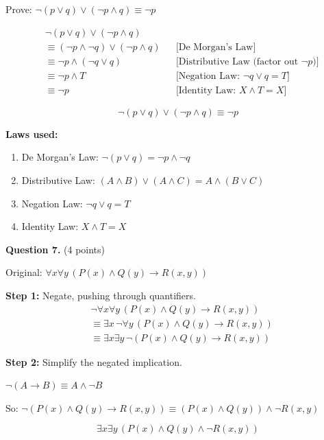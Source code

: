 \documentclass[11pt,a4paper]{article}
\begin{document}
\begin{solnbox}
Prove: $\neg(p \lor q) \lor (\neg p \land q) \equiv \neg p$

\begin{align*}
&\neg(p \lor q) \lor (\neg p \land q) \\
&\equiv (\neg p \land \neg q) \lor (\neg p \land q) && \text{[De Morgan's Law]} \\
&\equiv \neg p \land (\neg q \lor q) && \text{[Distributive Law (factor out $\neg p$)]} \\
&\equiv \neg p \land T && \text{[Negation Law: } \neg q \lor q = T\text{]} \\
&\equiv \neg p && \text{[Identity Law: } X \land T = X\text{]}
\end{align*}

$$\boxed{\neg(p \lor q) \lor (\neg p \land q) \equiv \neg p}$$

\textbf{Laws used:}
\begin{enumerate}[noitemsep]
    \item De Morgan's Law: $\neg(p \lor q) = \neg p \land \neg q$
    \item Distributive Law: $(A \land B) \lor (A \land C) = A \land (B \lor C)$
    \item Negation Law: $\neg q \lor q = T$
    \item Identity Law: $X \land T = X$
\end{enumerate}
\end{solnbox}

\vspace{15pt}

\textbf{Question 7.} (4 points)

\begin{solnbox}
Original: $\forall x \forall y\, (P(x) \land Q(y) \to R(x, y))$

\textbf{Step 1:} Negate, pushing through quantifiers.
\begin{align*}
&\neg \forall x \forall y\, (P(x) \land Q(y) \to R(x, y)) \\
&\equiv \exists x\, \neg \forall y\, (P(x) \land Q(y) \to R(x, y)) \\
&\equiv \exists x \exists y\, \neg(P(x) \land Q(y) \to R(x, y))
\end{align*}

\textbf{Step 2:} Simplify the negated implication.

$\neg(A \to B) \equiv A \land \neg B$

So: $\neg(P(x) \land Q(y) \to R(x, y)) \equiv (P(x) \land Q(y)) \land \neg R(x, y)$

$$\boxed{\exists x \exists y\, (P(x) \land Q(y) \land \neg R(x, y))}$$
\end{solnbox}
\end{document}
